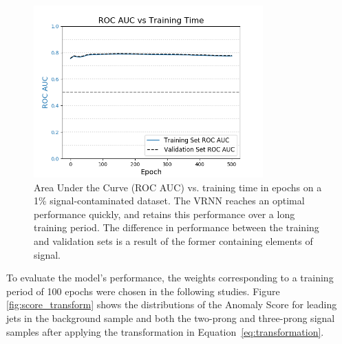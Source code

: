 \documentclass[12pt, a4paper]{article}
\begin{document}
\begin{figure}[H]
	\begin{center}
		\includegraphics[width=250pt]{imgs/bugfix/auc_vs_epoch_1p0_SaveForPaper.png}
	\end{center}
	\caption{Area Under the Curve (ROC AUC) vs. training time in epochs on a 1\% signal-contaminated dataset. The VRNN reaches an optimal performance quickly, and retains this performance over a long training period. The difference in performance between the training and validation sets is a result of the former containing elements of signal.}
	\label{fig:auc_vs_epoch}
\end{figure}


To evaluate the model's performance, the weights corresponding to a training period of 100 epochs were chosen in the following studies. Figure \ref{fig:score_transform} shows the distributions of the Anomaly Score for leading jets in the background sample and both the two-prong and three-prong signal samples after applying the transformation in Equation~\ref{eq:transformation}.
\end{document}
